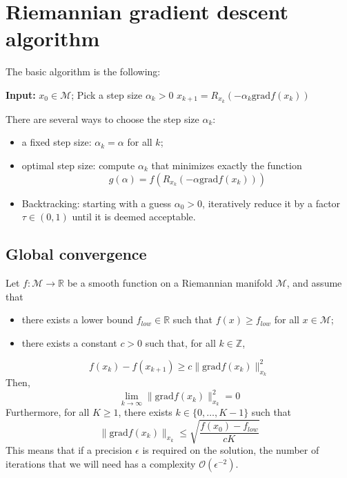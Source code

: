 \documentclass[12pt, openany]{report}
\newcommand{\R}{\mathbb{R}}
\newcommand{\Z}{\mathbb{Z}}
\newcommand{\M}{\mathcal{M}}
\renewcommand{\O}{\mathcal{O}}
\theoremstyle{definition}
\begin{document}
\section{Riemannian gradient descent algorithm}\label{sec:grad-descent}
The basic algorithm is the following:
\begin{algorithm}[H]
	\label{algo:RGD}
	\caption{Riemannian gradient descent}
	\begin{algorithmic}[1]
		\State \textbf{Input:} $x_0\in \M$;
			\State Pick a step size $\alpha_k >0$
			\State $x_{k+1} = R_{x_k}\left(-\alpha_k \text{grad} f(x_k)\right)$
		\EndFor	
	\end{algorithmic}
\end{algorithm}
There are several ways to choose the step size $\alpha_k$:
\begin{itemize}
	\item a fixed step size: $\alpha_k = \alpha$ for all $k$;
	\item optimal step size: compute $\alpha_k$ that minimizes exactly the function 
	\begin{equation}
		g(\alpha) = f\left(R_{x_k}(-\alpha \text{grad} f(x_k))\right)
	\end{equation}
	\item Backtracking: starting with a guess $\alpha_0>0$, iteratively reduce it by a factor $\tau \in (0,1)$ until it is deemed acceptable. 
\end{itemize}
\subsection{Global convergence}
Let $f:\M\to \R$ be a smooth function on a Riemannian manifold $\M$, and assume that 
\begin{itemize}
	\item there exists a lower bound $f_{low}\in \R$ such that $f(x)\ge f_{low}$ for all $x\in \M$;
	\item there exists a constant $c>0$ such that, for all $k\in \Z$, 
\end{itemize}
\begin{equation}\label{eq:decrease}
	f(x_k) - f(x_{k+1}) \ge c\| \text{grad} f(x_k)\|_{x_k}^2
\end{equation}
Then,
\begin{equation}
	\lim_{k\to \infty} \| \text{grad} f(x_k)\|_{x_k}^2 = 0 
\end{equation}
Furthermore, for all $K\ge1$, there exists $k\in \{0,\dots,K-1\}$ such that 
\begin{equation}
	\| \text{grad} f(x_k)\|_{x_k} \le \sqrt{\frac{f(x_0)-f_{low}}{cK}}
\end{equation}
This means that if a precision $\epsilon$ is required on the solution, the number of iterations that we will need has a complexity $\O(\epsilon^{-2})$. \\
\end{document}
